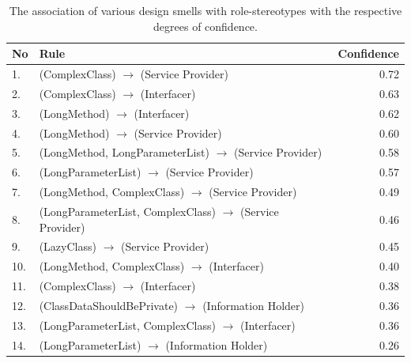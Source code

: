 \documentclass[AMA,Times1COL]{WileyNJDv5} %
\begin{document}
		\begin{table}[h]
		\centering %
		\caption{The association of various design smells with role-stereotypes with the respective degrees of confidence.} %
		\begin{tabular*}{350pt}{@{\extracolsep\fill}llr@{\extracolsep\fill}}%
			
			\toprule
			\textbf{No} & \textbf{Rule} &\textbf{ Confidence}  \\
			\midrule
			1. & (ComplexClass) $\rightarrow$ (Service Provider) & 0.72 \\
			2. & (ComplexClass) $\rightarrow$ (Interfacer) & 0.63 \\
			3. & (LongMethod) $\rightarrow$ (Interfacer) & 0.62 \\
			4. & (LongMethod) $\rightarrow$ (Service Provider) & 0.60 \\
			5. & (LongMethod, LongParameterList) $\rightarrow$ (Service Provider) & 0.58 \\
			6. & (LongParameterList) $\rightarrow$ (Service Provider) & 0.57 \\
			7. & (LongMethod, ComplexClass) $\rightarrow$ (Service Provider) & 0.49 \\
			8. & (LongParameterList, ComplexClass) $\rightarrow$ (Service Provider) & 0.46 \\
			9. & (LazyClass) $\rightarrow$ (Service Provider) & 0.45 \\
			10. & (LongMethod, ComplexClass) $\rightarrow$ (Interfacer) & 0.40 \\
			11. & (ComplexClass) $\rightarrow$ (Interfacer) & 0.38 \\
			12. & (ClassDataShouldBePrivate) $\rightarrow$ (Information Holder) & 0.36 \\
			13. & (LongParameterList, ComplexClass) $\rightarrow$ (Interfacer) & 0.36 \\
			14. & (LongParameterList) $\rightarrow$ (Information Holder) & 0.26 \\ 
			\bottomrule
		\end{tabular*}
		\label{table:assoc_ds_rs}
	\end{table} 
	
\end{document}
